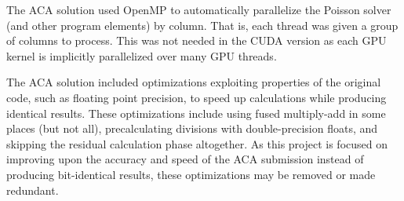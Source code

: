 The ACA solution used OpenMP\cite{OpenMPHomeOpenMP} to automatically parallelize the Poisson solver (and other program elements) by column.
That is, each thread was given a group of columns to process.
This was not needed in the CUDA version as each GPU kernel is implicitly parallelized over many GPU threads.

The ACA solution included optimizations exploiting properties of the original code, such as floating point precision, to speed up calculations while producing identical results.
These optimizations include using fused multiply-add\cite{Muller2010TheInstruction} in some places (but not all), precalculating divisions with double-precision floats, and skipping the residual calculation phase altogether.
As this project is focused on improving upon the accuracy and speed of the ACA submission instead of producing bit-identical results, these optimizations may be removed or made redundant.




